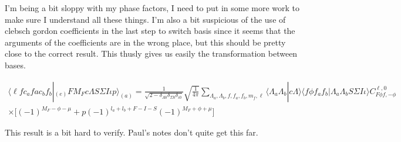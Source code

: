 \documentclass[prl, longbibliography]{revtex4-2}
\begin{document}
I'm being a bit sloppy with my phase factors, I need to put in some more work to make sure I understand all these things. I'm also a bit suspicious of the use of clebsch gordon coefficients in the last step to switch basis since it seems that the arguments of the coefficients are in the wrong place, but this should be pretty close to the correct result. This thusly gives us easily the transformation between bases.

\begin{equation}
\begin{split}
\langle \ell f c_a fa c_b f_b |_(e) FM_F c \Lambda S \Sigma I \iota p \rangle_(a) = \frac{1}{\sqrt{2-\delta_{\Lambda 0}\delta_{\Sigma 0}\delta_{\iota 0}}}
\sqrt{\frac{1}{4\pi}}
\sum_{\Lambda_a, \Lambda_b, f, f_a, f_b, m_f, \ell}
\langle\Lambda_a \Lambda_b|c\Lambda\rangle
\langle f\phi f_a f_b | \Lambda_a \Lambda_b S\Sigma I \iota \rangle
C_{F\phi f,-\phi}^{\ell,0}\\
\times\Bigg[
(-1)^{M_F-\phi-\mu}
+p(-1)^{l_a+l_b+F-I-S}
(-1)^{M_F+\phi+\mu}\Bigg]
\end{split}
\end{equation}

This result is a bit hard to verify. Paul's notes don't quite get this far. 


\end{document}

